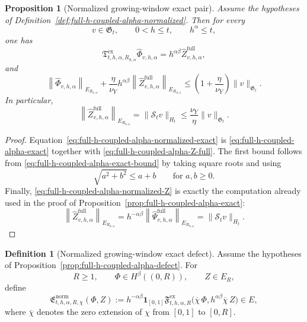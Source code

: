 \documentclass[11pt,a4paper]{amsart}
\theoremstyle{plain}
\newtheorem{proposition}[theorem]{Proposition}
\theoremstyle{definition}
\newtheorem{definition}[theorem]{Definition}
\theoremstyle{remark}
\newcommand{\one}{\mathbf 1}
\begin{document}
\begin{proposition}[Normalized growing-window exact pair]
\label{prop:full-h-coupled-alpha-normalized}
Assume the hypotheses of Definition~\ref{def:full-h-coupled-alpha-normalized}. Then for every
\[
v\in\mathfrak G_t,
\qquad
0<h\le t,
\qquad
h^\alpha\le t,
\]
one has
\begin{equation}\label{eq:full-h-coupled-alpha-normalized-exact}
\mathfrak T_{t,h,\alpha,R_{h,\alpha}}^{\mathrm{ex}}
\widehat\Phi_{v,h,\alpha}
=
h^{\alpha\beta}\widehat Z_{v,h,\alpha}^{\mathrm{full}},
\end{equation}
and
\begin{equation}\label{eq:full-h-coupled-alpha-normalized-bound}
\left\|
\widehat\Phi_{v,h,\alpha}
\right\|_{E_{R_{h,\alpha}}}
+
\frac{\eta}{\nu_Y}
h^{\alpha\beta}
\left\|
\widehat Z_{v,h,\alpha}^{\mathrm{full}}
\right\|_{E_{R_{h,\alpha}}}
\le
\left(1+\frac{\eta}{\nu_Y}\right)\|v\|_{\mathfrak G_t}.
\end{equation}
In particular,
\begin{equation}\label{eq:full-h-coupled-alpha-normalized-Z}
\left\|
\widehat Z_{v,h,\alpha}^{\mathrm{full}}
\right\|_{E_{R_{h,\alpha}}}
=
\|\mathcal S_t v\|_{H_t}
\le
\frac{\nu_Y}{\eta}\|v\|_{\mathfrak G_t}.
\end{equation}
\end{proposition}

\begin{proof}
Equation~\eqref{eq:full-h-coupled-alpha-normalized-exact} is
\eqref{eq:full-h-coupled-alpha-exact} together with
\eqref{eq:full-h-coupled-alpha-Z-full}. The first bound follows from
\eqref{eq:full-h-coupled-alpha-exact-bound} by taking square roots and using
\[
\sqrt{a^2+b^2}\le a+b
\qquad\text{for }a,b\ge0.
\]
Finally,
\eqref{eq:full-h-coupled-alpha-normalized-Z} is exactly the computation already used in the proof
of Proposition~\ref{prop:full-h-coupled-alpha-exact}:
\[
\left\|
\widehat Z_{v,h,\alpha}^{\mathrm{full}}
\right\|_{E_{R_{h,\alpha}}}
=
h^{-\alpha\beta}
\left\|
\widehat\Psi_{v,h,\alpha}^{\mathrm{full}}
\right\|_{E_{R_{h,\alpha}}}
=
\|\mathcal S_t v\|_{H_t}.
\]
\end{proof}

\begin{definition}[Normalized growing-window exact defect]
\label{def:full-h-coupled-alpha-defect-normalized}
Assume the hypotheses of Proposition~\ref{prop:full-h-coupled-alpha-defect}. For
\[
R\ge 1,
\qquad
\Phi\in H^\beta((0,R)),
\qquad
Z\in E_R,
\]
define
\begin{equation}\label{eq:full-h-coupled-alpha-defect-normalized}
\mathfrak E_{t,h,\alpha,R,\chi}^{\mathrm{norm}}(\Phi,Z)
:=
h^{-\alpha\beta}
\one_{[0,1]}
\mathfrak F_{t,h,\alpha,R}^{\mathrm{ex}}
\bigl(
\overline\chi\,\Phi,
h^{\alpha\beta}\overline\chi\,Z
\bigr)
\in E,
\end{equation}
where \(\overline\chi\) denotes the zero extension of \(\chi\) from \([0,1]\) to \([0,R]\).
\end{definition}
\end{document}
